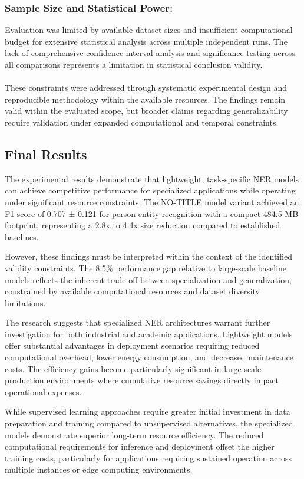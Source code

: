 \documentclass[a4paper]{usiinfbachelorproject}
\begin{document}
\subsubsection{\textbf{Sample Size and Statistical Power:}} Evaluation was limited by available dataset sizes and insufficient computational budget for extensive statistical analysis across multiple independent runs. The lack of comprehensive confidence interval analysis and significance testing across all comparisons represents a limitation in statistical conclusion validity.
\\ \\
These constraints were addressed through systematic experimental design and reproducible methodology within the available resources. The findings remain valid within the evaluated scope, but broader claims regarding generalizability require validation under expanded computational and temporal constraints.

\subsection{Final Results}

The experimental results demonstrate that lightweight, task-specific NER models can achieve competitive performance for specialized applications while operating under significant resource constraints. The NO-TITLE model variant achieved an F1 score of 0.707 ± 0.121 for person entity recognition with a compact 484.5 MB footprint, representing a 2.8x to 4.4x size reduction compared to established baselines.

However, these findings must be interpreted within the context of the identified validity constraints. The 8.5\% performance gap relative to large-scale baseline models reflects the inherent trade-off between specialization and generalization, constrained by available computational resources and dataset diversity limitations.

The research suggests that specialized NER architectures warrant further investigation for both industrial and academic applications. Lightweight models offer substantial advantages in deployment scenarios requiring reduced computational overhead, lower energy consumption, and decreased maintenance costs. The efficiency gains become particularly significant in large-scale production environments where cumulative resource savings directly impact operational expenses.

While supervised learning approaches require greater initial investment in data preparation and training compared to unsupervised alternatives, the specialized models demonstrate superior long-term resource efficiency. The reduced computational requirements for inference and deployment offset the higher training costs, particularly for applications requiring sustained operation across multiple instances or edge computing environments.
\end{document}

